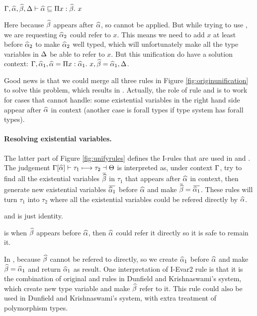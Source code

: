 $\Gamma, \widehat{\alpha}, \widehat{\beta}, \Delta \vdash \widehat{\alpha} \sqsubseteq \Pi x:\widehat{\beta}.~ x$

Here because $\widehat{\beta}$ appears after $\widehat{\alpha}$, so  cannot be applied. But while trying to use , we are requesting $\widehat{\alpha}_2$ could refer to  $x$. This means we need to add $x$ at least before $\widehat{\alpha}_2$ to make $\widehat{\alpha}_2$ well typed, which will unfortunately make all the type variables in $\Delta$ be able to refer to $x$. But this unification do have a solution context: $\Gamma, \widehat{\alpha}_1, \widehat{\alpha} = \Pi x:\widehat{\alpha}_1.~ x, \widehat{\beta} = \widehat{\alpha}_1, \Delta$.

Good news is that we could merge all three rules in Figure \ref{fig:originunification} to solve this problem, which results in . Actually, the role of rule  and  is to work for cases that  cannot handle: some existential variables in the right hand side appear after $\widehat{\alpha}$ in context (another case is forall types if type system has forall types).

\paragraph{Resolving existential variables.} The latter part of Figure \ref{fig:unifyrules} defines the I-rules that are used in  and . The judgement $\Gamma[\widehat{\alpha}] \vdash \tau_1 \longmapsto \tau_2 \dashv \Theta$ is interpreted as, under context $\Gamma$, try to find all the existential variables $\overbar \genB$ in $\tau_1$ that appears after $\widehat{\alpha}$ in context, then generate new existential variables $\overbar {\genA_1}$ before $\widehat{\alpha}$ and make $\overbar \genB = \overbar {\genA_1}$. These rules will turn $\tau_1$ into $\tau_2$ where all the existential variables could be refered directly by $\widehat{\alpha}$.

 and  is just identity.

 is when $\widehat{\beta}$ appears before $\widehat{\alpha}$, then $\widehat{\alpha}$ could refer it directly so it is safe to remain it.

In , because $\widehat{\beta}$ cannot be refered to directly, so we create $\widehat{\alpha}_1$ before $\widehat{\alpha}$ and make $\widehat{\beta}=\widehat{\alpha}_1$ and return $\widehat{\alpha}_1$ as result. One interpretation of I-Evar2 rule is that it is the combination of original  and  rules in Dunfield and Krishnaswami's system, which create new type variable and make $\widehat{\beta}$ refer to it. This rule could also be used in Dunfield and Krishnaswami's system, with extra treatment of polymorphism types.

